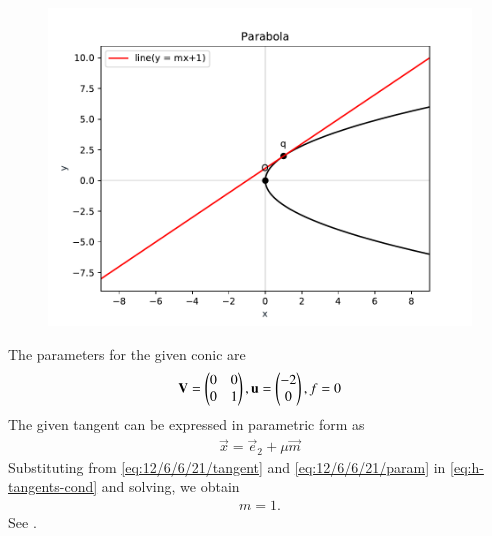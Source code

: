 	\begin{figure}[!h]
		\centering
 \includegraphics[width=\columnwidth]{chapters/12/6/6/21/figs/im.pdf}
		\caption{}
		\label{fig:12/6/6/21}
  	\end{figure}
The parameters for the given conic are
\begin{align}
    \mathbf{V} = \begin{pmatrix}0&0\\0&1\end{pmatrix}, \mathbf{u} = \begin{pmatrix}-2\\0\end{pmatrix}, f = 0
		\label{eq:12/6/6/21/param}
\end{align}
The given tangent can be expressed in parametric form as
\begin{align}
		\label{eq:12/6/6/21/tangent}
\vec{x} = \vec{e}_2 + \mu\vec{m}
\end{align}
Substituting from 
		\eqref{eq:12/6/6/21/tangent}
		and
		\eqref{eq:12/6/6/21/param}
		in 
	  \eqref{eq:h-tangents-cond}
and solving, we obtain 
\begin{align}
	m = 1.
\end{align}
		See .
